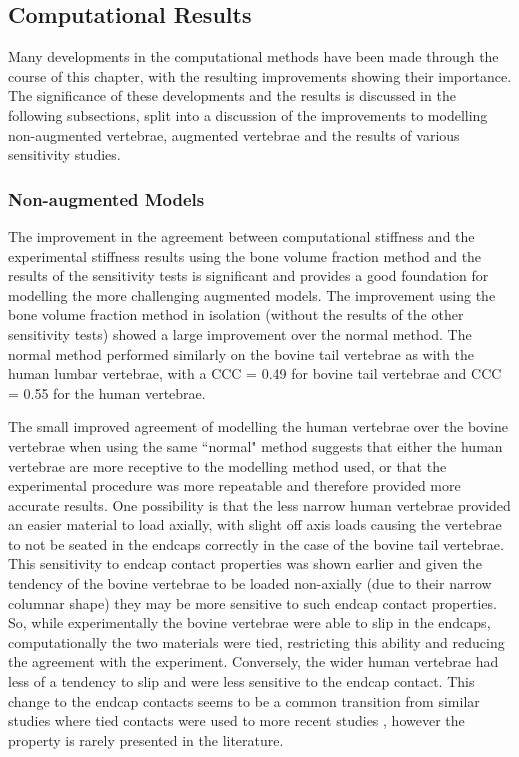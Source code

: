 \subsection{Computational Results}

Many developments in the computational methods have been made through the
course of this chapter, with the resulting improvements showing their
importance. The significance of these developments and the results is discussed
in the following subsections, split into a discussion of the improvements to
modelling non-augmented vertebrae, augmented vertebrae and the results of
various sensitivity studies.


\subsubsection{Non-augmented Models}

The improvement in the agreement between computational stiffness and the
experimental stiffness results using the bone volume fraction method and the
results of the sensitivity tests is significant and provides a good foundation
for modelling the more challenging augmented models. The improvement using the
bone volume fraction method in isolation (without the results of the other
sensitivity tests) showed a large improvement over the normal method.  The
normal method performed similarly on the bovine tail vertebrae as with the
human lumbar vertebrae, with a CCC = 0.49 for bovine tail vertebrae and CCC =
0.55 for the human vertebrae. 

The small improved agreement of modelling the human vertebrae over the bovine
vertebrae when using the same ``normal" method suggests that either the human
vertebrae are more receptive to the modelling method used, or that the
experimental procedure was more repeatable and therefore provided more accurate
results. One possibility is that the less narrow human vertebrae provided an
easier material to load axially, with slight off axis loads causing the
vertebrae to not be seated in the endcaps correctly in the case of the bovine
tail vertebrae. This sensitivity to endcap contact properties was shown earlier
and given the tendency of the bovine vertebrae to be loaded non-axially (due to
their narrow columnar shape) they may be more sensitive to such endcap contact
properties. So, while experimentally the bovine vertebrae were able to slip in
the endcaps, computationally the two materials were tied, restricting this
ability and reducing the agreement with the experiment. Conversely, the wider
human vertebrae had less of a tendency to slip and were less sensitive to the
endcap contact. This change to the endcap contacts seems to be a common
transition from similar studies where tied contacts were used
\cite{Wijayathunga2008} to more recent studies
\cite{kinzl2013experimentally,Kinzl2012a}, however the property is rarely
presented in the literature.

